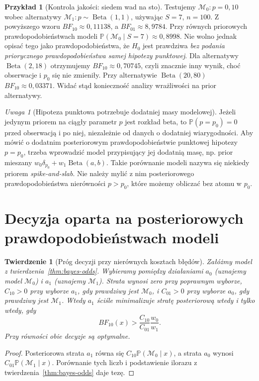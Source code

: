 \documentclass[11pt,a4paper,oneside]{report}
\numberwithin{equation}{chapter}
\theoremstyle{plain}
\newtheorem{twierdzenie}{Twierdzenie}[chapter]
\theoremstyle{definition}
\newtheorem{przyklad}{Przykład}[chapter]
\theoremstyle{remark}
\newtheorem{uwaga}{Uwaga}[chapter]
\newcommand{\Prob}{\mathbb P}
\begin{document}
\begin{przyklad}[Kontrola jakości: siedem wad na sto]
Testujemy $\mathcal M_0:p=0{,}10$ wobec alternatywy
$\mathcal M_1:p\sim\operatorname{Beta}(1,1)$, używając
$S=7$, $n=100$. Z powyższego wzoru
$BF_{10}\approx0{,}11138$, a $BF_{01}\approx8{,}9784$.
Przy równych priorowych prawdopodobieństwach modeli
$\Prob(\mathcal M_0\mid S=7)\approx0{,}8998$.
Nie wolno jednak opisać tego jako prawdopodobieństwa, że
$H_0$ jest prawdziwa \emph{bez podania priorycznego
prawdopodobieństwa samej hipotezy punktowej}.
Dla alternatywy $\operatorname{Beta}(2,18)$ otrzymujemy
$BF_{10}\approx0{,}70745$, czyli znacznie inny wynik,
choć obserwacje i $p_0$ się nie zmieniły.
Przy alternatywie $\operatorname{Beta}(20,80)$
$BF_{10}\approx0{,}03371$. Widać stąd konieczność
analizy wrażliwości na prior alternatywy.
\end{przyklad}

\begin{uwaga}[Hipoteza punktowa potrzebuje dodatniej masy modelowej]
Jeżeli jedynym priorem na ciągły parametr $p$ jest rozkład
beta, to $\Prob(p=p_0)=0$ przed obserwacją i po niej,
niezależnie od danych o dodatniej wiarygodności.
Aby mówić o dodatnim posteriorowym prawdopodobieństwie
punktowej hipotezy $p=p_0$, trzeba wprowadzić model
przypisujący jej dodatnią masę, np. prior mieszany
$w_0\delta_{p_0}+w_1\operatorname{Beta}(a,b)$.
Takie porównanie modeli nazywa się niekiedy priorem
\emph{spike-and-slab}. Nie należy mylić z nim posteriorowego
prawdopodobieństwa nierówności $p>p_0$, które możemy obliczać
bez atomu w $p_0$.
\end{uwaga}

\section{Decyzja oparta na posteriorowych prawdopodobieństwach modeli}
\begin{twierdzenie}[Próg decyzji przy nierównych kosztach błędów]
\label{thm:bayes-hypothesis-decision}
Załóżmy model z twierdzenia~\ref{thm:bayes-odds}.
Wybieramy pomiędzy działaniami $a_0$ (uznajemy model
$\mathcal M_0$) i $a_1$ (uznajemy $\mathcal M_1$).
Strata wynosi zero przy poprawnym wyborze,
$C_{10}>0$ przy wyborze $a_1$, gdy prawdziwy jest
$\mathcal M_0$, i $C_{01}>0$ przy wyborze $a_0$,
gdy prawdziwy jest $\mathcal M_1$. Wtedy $a_1$
ściśle minimalizuje stratę posteriorową wtedy i tylko wtedy, gdy
\[
 BF_{10}(x)>\frac{C_{10}}{C_{01}}\frac{w_0}{w_1}.
\]
Przy równości obie decyzje są optymalne.
\end{twierdzenie}
\begin{proof}
Posteriorowa strata $a_1$ równa się
$C_{10}\Prob(\mathcal M_0\mid x)$, a strata $a_0$ wynosi
$C_{01}\Prob(\mathcal M_1\mid x)$.
Porównanie tych liczb i podstawienie ilorazu z
 twierdzenia~\ref{thm:bayes-odds} daje tezę.
\end{proof}
\end{document}
